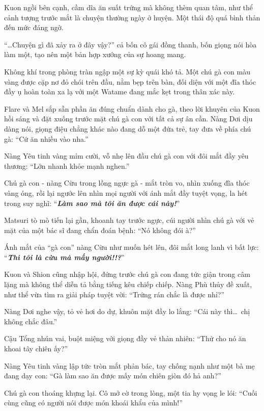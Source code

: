 \documentclass[../main.tex]{subfiles}
\begin{document}
Kuon ngồi bên cạnh, cầm dĩa ăn suất trứng mà không thèm quan tâm, như thể cảnh tượng trước mắt là chuyện thường ngày ở huyện. Một thái độ quá bình thản đến mức đáng ngờ.

``\dots  Chuyện gì đã xảy ra ở đây vậy?'' cả bốn cô gái đồng thanh, bốn giọng nói hòa làm một, tạo nên một bản hợp xướng của sự hoang mang.

\ct

Không khí trong phòng tràn ngập một sự kỳ quái khó tả. Một chú gà con màu vàng được cặp nơ đỏ chói trên đầu, nằm bẹp trên bàn, đối diện với một đĩa thóc đầy ụ hoàn toàn xa lạ với một Watame đang mắc kẹt trong thân xác này.


Flare và Mel sắp sẵn phần ăn đúng chuẩn dành cho gà, theo lời khuyên của Kuon hồi sáng và đặt xuống trước mặt chú gà con với tất cả sự ân cần. Nàng Dơi dịu dàng nói, giọng điệu chẳng khác nào đang dỗ một đứa trẻ, tay đưa về phía chú gà: ``Cứ ăn nhiều vào nha.''

Nàng Yêu tinh vàng mỉm cười, vỗ nhẹ lên đầu chú gà con với đôi mắt đầy yêu thương: ``Lớn nhanh khỏe mạnh nghen.''

Chú gà con - nàng Cừu trong lồng ngực gà - mắt tròn vo, nhìn xuống đĩa thóc vàng óng, rồi lại ngước lên nhìn mọi người với ánh mắt đầy tuyệt vọng, la hét trong suy nghĩ: ``\textbf{\textit{Làm sao mà tôi ăn được cái này!}}''

Matsuri tò mò tiến lại gần, khoanh tay trước ngực, cúi người nhìn chú gà với vẻ mặt của một bác sĩ đang chẩn đoán bệnh: ``Nó không đói à?''

Ánh mắt của ``gà con'' nàng Cừu như muốn hét lên, đôi mắt long lanh vì bất lực: ``\textit{\textbf{Thì tôi là cừu mà mấy người!!?}}''

Kuon và Shion cũng nhập hội, đứng trước chú gà con đang tức giận trong câm lặng mà không thể diễn tả bằng tiếng kêu chiếp chiếp. Nàng Phù thủy đề xuất, như thể vừa tìm ra giải pháp tuyệt vời:
``Trứng rán chắc là được nhỉ?''

Nàng Dơi nghe vậy, tỏ vẻ hơi do dự, khuôn mặt đầy lo lắng:
``Cái này thì\dots\ chị không chắc đâu.''

Cậu Tổng nhún vai, buột miệng với giọng đầy vẻ thản nhiên:
``Thử cho nó ăn khoai tây chiên ấy?''

Nàng Yêu tinh vàng lập tức tròn mắt phản bác, tay chống nạnh như một bà mẹ đang dạy con: ``Gà làm sao ăn được mấy món chiên giòn đó hả anh?''

Chú gà con thoáng khựng lại. Cô mở cờ trong lòng, một tia hy vọng le lói: ``Cuối cùng cũng có người nói được món khoái khẩu của mình!''
\end{document}
